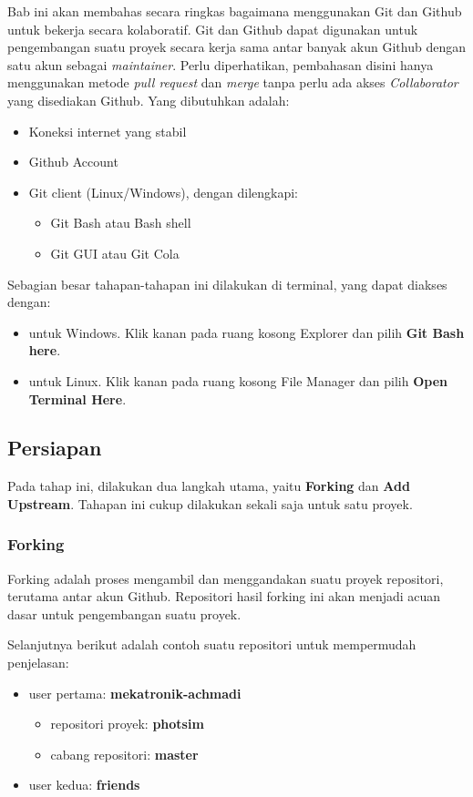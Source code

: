 \documentclass[12pt]{article}
\begin{document}
	Bab ini akan membahas secara ringkas bagaimana menggunakan Git dan Github untuk bekerja secara kolaboratif.
	Git dan Github dapat digunakan untuk pengembangan suatu proyek secara kerja sama antar banyak akun Github dengan satu akun sebagai \textit{maintainer}.
	Perlu diperhatikan, pembahasan disini hanya menggunakan metode \textit{pull request} dan \textit{merge} tanpa perlu ada akses \textit{Collaborator} yang disediakan Github.
	Yang dibutuhkan adalah:
	\begin{itemize}
		\item Koneksi internet yang stabil
		\item Github Account
		\item Git client (Linux/Windows), dengan dilengkapi:
		\begin{itemize}
			\item Git Bash atau Bash shell
			\item Git GUI atau Git Cola
		\end{itemize}
	\end{itemize}

	Sebagian besar tahapan-tahapan ini dilakukan di terminal, yang dapat diakses dengan:
	\begin{itemize}
		\item untuk Windows. Klik kanan pada ruang kosong Explorer dan pilih \textbf{Git Bash here}.
		\item untuk Linux. Klik kanan pada ruang kosong File Manager dan pilih \textbf{Open Terminal Here}.  
	\end{itemize}

	\subsection{Persiapan}
	
	Pada tahap ini, dilakukan dua langkah utama, yaitu \textbf{Forking} dan \textbf{Add Upstream}.
	Tahapan ini cukup dilakukan sekali saja untuk satu proyek. 
	
	\subsubsection{Forking}
	
	Forking adalah proses mengambil dan menggandakan suatu proyek repositori, terutama antar akun Github.
	Repositori hasil forking ini akan menjadi acuan dasar untuk pengembangan suatu proyek.
	
	Selanjutnya berikut adalah contoh suatu repositori untuk mempermudah penjelasan:
	\begin{itemize}
		\item user pertama: \textbf{mekatronik-achmadi}
		\begin{itemize}
			\item repositori proyek: \textbf{photsim}
			\item cabang repositori: \textbf{master}	 
		\end{itemize}
		\item user kedua: \textbf{friends} 
	\end{itemize}
\end{document}
